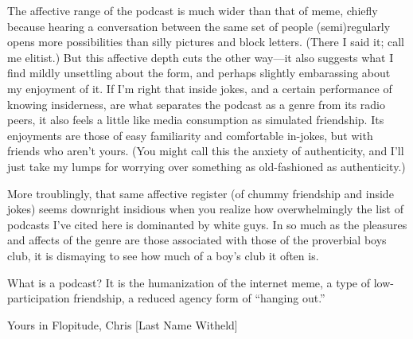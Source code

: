 \documentclass[
  12pt,
]{article}
\begin{document}
The affective range of the podcast is much wider than that of meme,
chiefly because hearing a conversation between the same set of people
(semi)regularly opens more possibilities than silly pictures and block
letters. (There I said it; call me elitist.) But this affective depth
cuts the other way---it also suggests what I find mildly unsettling
about the form, and perhaps slightly embarassing about my enjoyment of
it. If I'm right that inside jokes, and a certain performance of knowing
insiderness, are what separates the podcast as a genre from its radio
peers, it also feels a little like media consumption as simulated
friendship. Its enjoyments are those of easy familiarity and comfortable
in-jokes, but with friends who aren't yours. (You might call this the
anxiety of authenticity, and I'll just take my lumps for worrying over
something as old-fashioned as authenticity.)

More troublingly, that same affective register (of chummy friendship and
inside jokes) seems downright insidious when you realize how
overwhelmingly the list of podcasts I've cited here is dominanted by
white guys. In so much as the pleasures and affects of the genre are
those associated with those of the proverbial boys club, it is dismaying
to see how much of a boy's club it often is.

What is a podcast? It is the humanization of the internet meme, a type
of low-participation friendship, a reduced agency form of ``hanging
out.''

Yours in Flopitude, Chris {[}Last Name Witheld{]}
\end{document}
